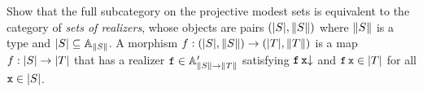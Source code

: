 \begin{exercise}
  Show that the full subcategory on the projective modest sets is equivalent to the category of \emph{sets of realizers}, whose objects are pairs $(\S{S}, \T{S})$ where $\T{S}$ is a type and $\S{S} \subseteq \Atyp{\T{S}}$. A morphism $f : (\S{S}, \T{S}) \to (\S{T}, \T{T})$ is a map $f : \S{S} \to \S{T}$ that has a realizer $\R{f} \in \subAtyp{\T{S} \to \T{T}}$ satisfying $\defined{\R{f}\,\R{x}}$ and $\R{f}\,\R{x} \in \S{T}$ for all $\R{x} \in \S{S}$.
\end{exercise}

